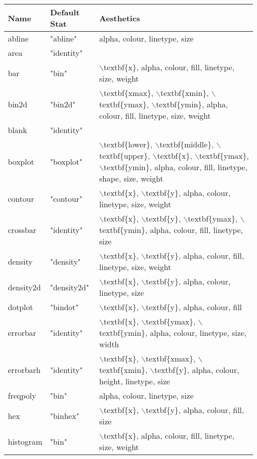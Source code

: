 \begin{table}[ht]
\centering
\begin{tabular}{lll}
  \hline
Name & Default Stat & Aesthetics \\ 
  \hline
abline & "abline" & alpha, colour, linetype, size \\ 
  area & "identity" &  \\ 
  bar & "bin" & $\backslash$textbf\{x\}, alpha, colour, fill, linetype, size, weight \\ 
  bin2d & "bin2d" & $\backslash$textbf\{xmax\}, $\backslash$textbf\{xmin\}, $\backslash$textbf\{ymax\}, $\backslash$textbf\{ymin\}, alpha, colour, fill, linetype, size, weight \\ 
  blank & "identity" &  \\ 
  boxplot & "boxplot" & $\backslash$textbf\{lower\}, $\backslash$textbf\{middle\}, $\backslash$textbf\{upper\}, $\backslash$textbf\{x\}, $\backslash$textbf\{ymax\}, $\backslash$textbf\{ymin\}, alpha, colour, fill, linetype, shape, size, weight \\ 
  contour & "contour" & $\backslash$textbf\{x\}, $\backslash$textbf\{y\}, alpha, colour, linetype, size, weight \\ 
  crossbar & "identity" & $\backslash$textbf\{x\}, $\backslash$textbf\{y\}, $\backslash$textbf\{ymax\}, $\backslash$textbf\{ymin\}, alpha, colour, fill, linetype, size \\ 
  density & "density" & $\backslash$textbf\{x\}, $\backslash$textbf\{y\}, alpha, colour, fill, linetype, size, weight \\ 
  density2d & "density2d" & $\backslash$textbf\{x\}, $\backslash$textbf\{y\}, alpha, colour, linetype, size \\ 
  dotplot & "bindot" & $\backslash$textbf\{x\}, $\backslash$textbf\{y\}, alpha, colour, fill \\ 
  errorbar & "identity" & $\backslash$textbf\{x\}, $\backslash$textbf\{ymax\}, $\backslash$textbf\{ymin\}, alpha, colour, linetype, size, width \\ 
  errorbarh & "identity" & $\backslash$textbf\{x\}, $\backslash$textbf\{xmax\}, $\backslash$textbf\{xmin\}, $\backslash$textbf\{y\}, alpha, colour, height, linetype, size \\ 
  freqpoly & "bin" & alpha, colour, linetype, size \\ 
  hex & "binhex" & $\backslash$textbf\{x\}, $\backslash$textbf\{y\}, alpha, colour, fill, size \\ 
  histogram & "bin" & $\backslash$textbf\{x\}, alpha, colour, fill, linetype, size, weight \\ 

\end{tabular}
\end{table}
